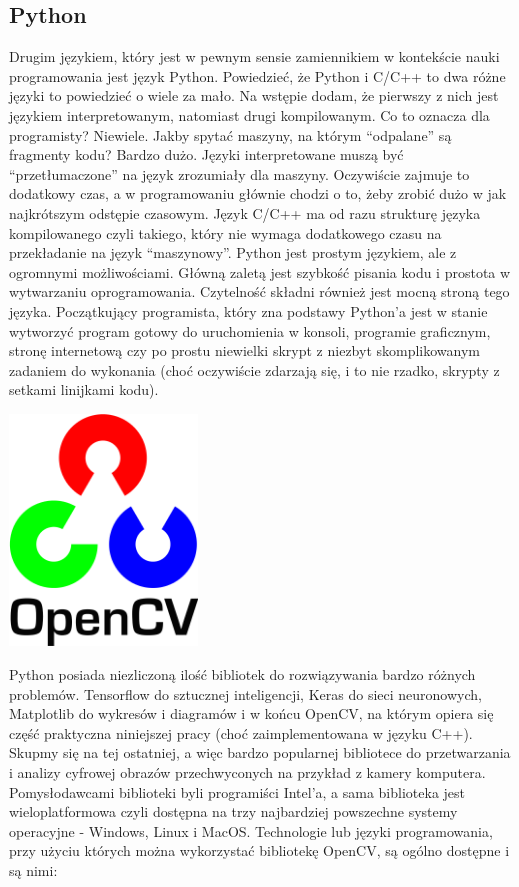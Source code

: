 \documentclass{article}
\begin{document}
\subsection{Python}
Drugim językiem, który jest w pewnym sensie zamiennikiem w kontekście nauki programowania jest język Python. Powiedzieć, że Python i C/C++ to dwa różne języki to powiedzieć o wiele za mało. Na wstępie dodam, że pierwszy z nich jest językiem interpretowanym, natomiast drugi kompilowanym. Co to oznacza dla programisty? Niewiele. Jakby spytać maszyny, na którym “odpalane” są fragmenty kodu? Bardzo dużo. Języki interpretowane muszą być “przetłumaczone” na język zrozumiały dla maszyny. Oczywiście zajmuje to dodatkowy czas, a w programowaniu głównie chodzi o to, żeby zrobić dużo w jak najkrótszym odstępie czasowym. Język C/C++ ma od razu strukturę języka kompilowanego czyli takiego, który nie wymaga dodatkowego czasu na przekładanie na język “maszynowy”. Python jest prostym językiem, ale z ogromnymi możliwościami. Główną zaletą jest szybkość pisania kodu i prostota w wytwarzaniu oprogramowania. Czytelność składni również jest mocną stroną tego języka. Początkujący programista, który zna podstawy Python’a jest w stanie wytworzyć program gotowy do uruchomienia w konsoli, programie graficznym, stronę internetową czy po prostu niewielki skrypt z niezbyt skomplikowanym zadaniem do wykonania (choć oczywiście zdarzają się, i to nie rzadko, skrypty z setkami linijkami kodu).
\begin{center}
	\includegraphics[width=5cm]{opencv}
\end{center}
\par
Python posiada niezliczoną ilość bibliotek do rozwiązywania bardzo różnych problemów. Tensorflow do sztucznej inteligencji, Keras do sieci neuronowych, Matplotlib do wykresów i diagramów i w końcu OpenCV, na którym opiera się część praktyczna niniejszej pracy (choć zaimplementowana w języku C++). Skupmy się na tej ostatniej, a więc bardzo popularnej bibliotece do przetwarzania i analizy cyfrowej obrazów przechwyconych na przykład z kamery komputera. Pomysłodawcami biblioteki byli programiści Intel’a, a sama biblioteka jest wieloplatformowa czyli dostępna na trzy najbardziej powszechne systemy operacyjne - Windows, Linux i MacOS. Technologie lub języki programowania, przy użyciu których można wykorzystać bibliotekę OpenCV, są ogólno dostępne i są nimi:
\end{document}
